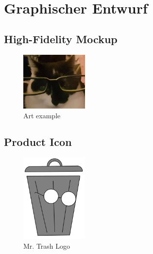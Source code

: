 \documentclass[12pt, a4paper]{scrreprt}
\begin{document}

\chapter{Graphischer Entwurf} 

\section{High-Fidelity Mockup}
\begin{figure}[h]
\centering
\includegraphics[width=0.3\textwidth]{../graphical/test.jpg}
\caption{\label{fig:art1} Art example}
\end{figure}

\section{Product Icon}
\begin{figure}[h]
\centering
\includegraphics[width=0.3\textwidth]{../graphical/logo_draft_color.png}
\caption{\label{fig:logo} Mr. Trash Logo}
\end{figure}



\end{document}
